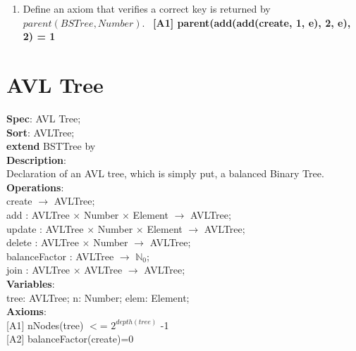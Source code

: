 \documentclass[12pt]{article}
\begin{document}
\begin{spacing}{1.5}
\begin{enumerate}
\item Define an axiom that verifies a correct key is returned by $parent(BSTree, Number)$.\
\hspace*{5mm} \textbf{[A1] parent(add(add(create, 1, e), 2, e), 2) = 1}
\

\end{enumerate}

\newpage

\section*{AVL Tree}

\noindent \textbf{Spec}: AVL Tree;\\
\noindent \textbf{Sort}: AVLTree;\\
\noindent \textbf{extend} BSTTree by\\
\noindent \textbf{Description}:\\Declaration of an AVL tree, which is simply put, a balanced Binary Tree.\\
\noindent \textbf{Operations}:\\
\hspace*{5mm} create $\rightarrow$ AVLTree;\\
\hspace*{5mm} add : AVLTree $\times$ Number $\times$ Element $\rightarrow$ AVLTree;\\
\hspace*{5mm} update : AVLTree $\times$ Number $\times$ Element $\rightarrow$ AVLTree;\\
\hspace*{5mm} delete : AVLTree $\times$ Number $\rightarrow$ AVLTree;\\
\hspace*{5mm} balanceFactor :  AVLTree $\rightarrow$ $\mathbb{N}_0$;\\
\hspace*{5mm} join : AVLTree $\times$ AVLTree $\rightarrow$ AVLTree;\\
\noindent \textbf{Variables}:\\
\hspace*{5mm} tree: AVLTree; n: Number; elem: Element;\\
\noindent \textbf{Axioms}:\\
\hspace*{5mm} [A1] nNodes(tree) $<$= $2^{depth(tree)}$ -1\\
\hspace*{5mm} [A2] balanceFactor(create)=0\\

\end{spacing}
\end{document}
